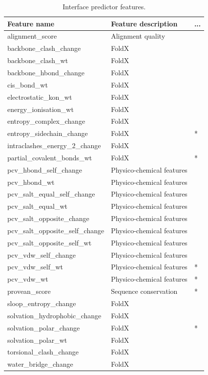 \begin{table}[ht]
\caption{Interface predictor features.} \label{tab:interface_features}
	\begin{tabular}{ | l | l | l | }
	Feature name & Feature description & ... \\
	\hline
		alignment\_score & Alignment quality & \  \\ \hline
		backbone\_clash\_change & FoldX & \  \\ \hline
		backbone\_clash\_wt & FoldX & \  \\ \hline
		backbone\_hbond\_change & FoldX & \  \\ \hline
		cis\_bond\_wt & FoldX & \  \\ \hline
		electrostatic\_kon\_wt & FoldX & \  \\ \hline
		energy\_ionisation\_wt & FoldX & \  \\ \hline
		entropy\_complex\_change & FoldX & \  \\ \hline
		entropy\_sidechain\_change & FoldX & * \\ \hline
		intraclashes\_energy\_2\_change & FoldX & \  \\ \hline
		partial\_covalent\_bonds\_wt & FoldX & * \\ \hline
		pcv\_hbond\_self\_change & Physico-chemical features & \  \\ \hline
		pcv\_hbond\_wt & Physico-chemical features & \  \\ \hline
		pcv\_salt\_equal\_self\_change & Physico-chemical features & \  \\ \hline
		pcv\_salt\_equal\_wt & Physico-chemical features & \  \\ \hline
		pcv\_salt\_opposite\_change & Physico-chemical features & \  \\ \hline
		pcv\_salt\_opposite\_self\_change & Physico-chemical features & \  \\ \hline
		pcv\_salt\_opposite\_self\_wt & Physico-chemical features & \  \\ \hline
		pcv\_vdw\_self\_change & Physico-chemical features & \  \\ \hline
		pcv\_vdw\_self\_wt & Physico-chemical features & * \\ \hline
		pcv\_vdw\_wt & Physico-chemical features & * \\ \hline
		provean\_score & Sequence conservation & * \\ \hline
		sloop\_entropy\_change & FoldX & \  \\ \hline
		solvation\_hydrophobic\_change & FoldX & \  \\ \hline
		solvation\_polar\_change & FoldX & * \\ \hline
		solvation\_polar\_wt & FoldX & \  \\ \hline
		torsional\_clash\_change & FoldX & \  \\ \hline
		water\_bridge\_change & FoldX & \  \\ \hline
	\end{tabular}
\end{table}


